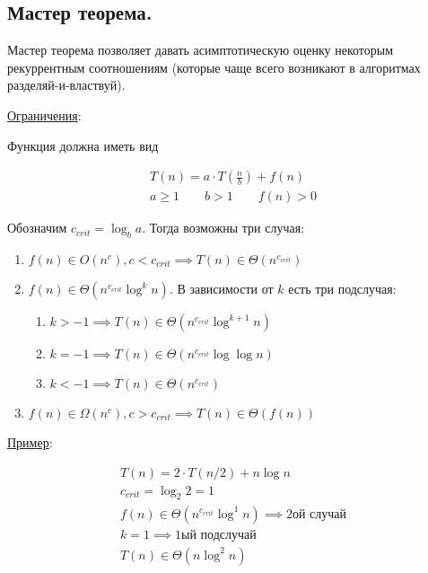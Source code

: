 \subsection{%
  Мастер теорема.%
}

Мастер теорема позволяет давать асимптотическую оценку некоторым рекуррентным
соотношениям (которые чаще всего возникают в алгоритмах разделяй-и-властвуй).

\underline{Ограничения}:

Функция должна иметь вид

\begin{align*}
  T(n) = a \cdot T \left( \frac{n}{b} \right) + f(n) \\
  a \ge 1 \qquad b > 1 \qquad f(n) > 0
\end{align*}

Обозначим \(c_{crit} = \log_{b} a\). Тогда возможны три случая:

\begin{enumerate}
  \item \(
    f(n) \in O(n^{c}), c < c_{crit}
    \implies T(n) \in \Theta(n^{c_{crit}})
  \)

  \item \(f(n) \in \Theta(n^{c_{crit}} \log^{k} n)\). В зависимости от \(k\)
  есть три подслучая:

  \begin{enumerate}
    \item \(k > -1 \implies T(n) \in \Theta(n^{c_{crit}} \log^{k + 1} n)\)
    \item \(k = -1 \implies T(n) \in \Theta(n^{c_{crit}} \log \log n)\)
    \item \(k < -1 \implies T(n) \in \Theta(n^{c_{crit}})\)
  \end{enumerate}

  \item \(
    f(n) \in \Omega(n^{c}), c > c_{crit}
    \implies T(n) \in \Theta(f(n))
  \)
\end{enumerate}

\underline{Пример}:

\begin{align*}
  T(n) = 2 \cdot T(n / 2) + n \log n \\
  c_{crit} = \log_{2} 2 = 1 \\
  f(n) \in \Theta(n^{c_{crit}} \log^{1} n) \implies \text{2ой случай} \\
  k = 1 \implies \text{1ый подслучай} \\
  T(n) \in \Theta(n \log^{2} n)
\end{align*}
